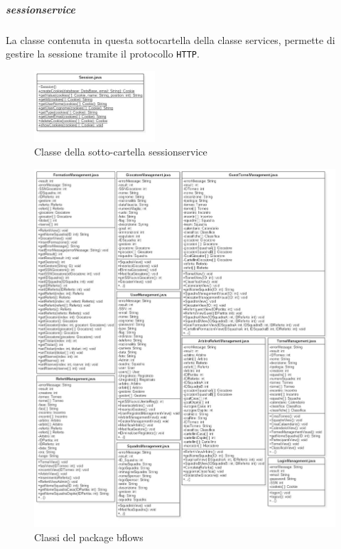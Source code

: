 	
	\subparagraph{sessionservice}
	La classe contenuta in questa sottocartella della classe services, permette di gestire la sessione tramite il protocollo \texttt{HTTP}.
	
	\begin{figure}[h]
		\centering
		\includegraphics[width=0.4\textwidth]
		{immagini/c-sessionservice}
		
		\caption{Classe della sotto-cartella sessionservice}
	\end{figure}
	
	
	\clearpage
	
	\begin{figure}[h]
		\centering
		\includegraphics[width=1\textwidth]
		{immagini/c-bflows}
		
		\caption{Classi del package bflows}
	\end{figure}
	
